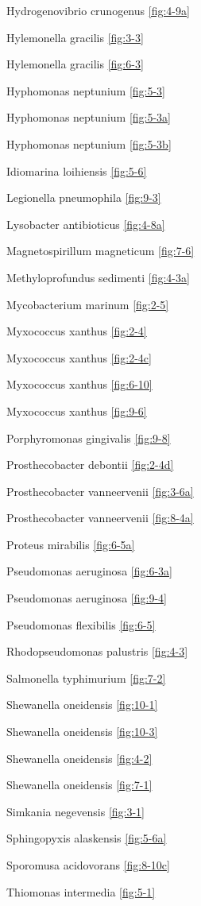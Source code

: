 \documentclass[]{tufte-book}
\begin{document}
Hydrogenovibrio crunogenus \ref{fig:4-9a}

Hylemonella gracilis \ref{fig:3-3}

Hylemonella gracilis \ref{fig:6-3}

Hyphomonas neptunium \ref{fig:5-3}

Hyphomonas neptunium \ref{fig:5-3a}

Hyphomonas neptunium \ref{fig:5-3b}

Idiomarina loihiensis \ref{fig:5-6}

Legionella pneumophila \ref{fig:9-3}

Lysobacter antibioticus \ref{fig:4-8a}

Magnetospirillum magneticum \ref{fig:7-6}

Methyloprofundus sedimenti \ref{fig:4-3a}

Mycobacterium marinum \ref{fig:2-5}

Myxococcus xanthus \ref{fig:2-4}

Myxococcus xanthus \ref{fig:2-4c}

Myxococcus xanthus \ref{fig:6-10}

Myxococcus xanthus \ref{fig:9-6}

Porphyromonas gingivalis \ref{fig:9-8}

Prosthecobacter debontii \ref{fig:2-4d}

Prosthecobacter vanneervenii \ref{fig:3-6a}

Prosthecobacter vanneervenii \ref{fig:8-4a}

Proteus mirabilis \ref{fig:6-5a}

Pseudomonas aeruginosa \ref{fig:6-3a}

Pseudomonas aeruginosa \ref{fig:9-4}

Pseudomonas flexibilis \ref{fig:6-5}

Rhodopseudomonas palustris \ref{fig:4-3}

Salmonella typhimurium \ref{fig:7-2}

Shewanella oneidensis \ref{fig:10-1}

Shewanella oneidensis \ref{fig:10-3}

Shewanella oneidensis \ref{fig:4-2}

Shewanella oneidensis \ref{fig:7-1}

Simkania negevensis \ref{fig:3-1}

Sphingopyxis alaskensis \ref{fig:5-6a}

Sporomusa acidovorans \ref{fig:8-10c}

Thiomonas intermedia \ref{fig:5-1}
\end{document}
